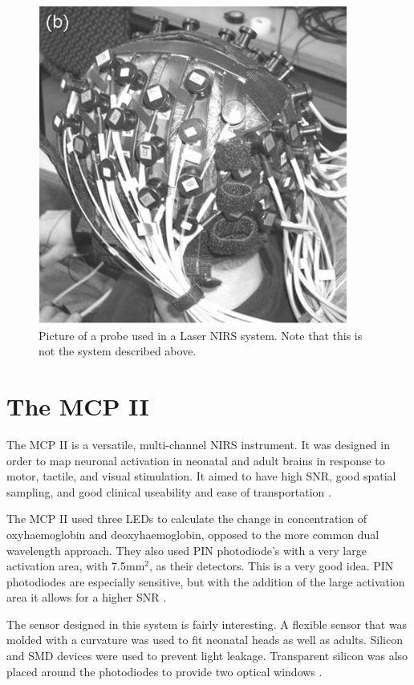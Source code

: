 \begin{figure}[htp]
\centering
\includegraphics[width=4in]{laser.png}
\caption[Laser NIRS System]{Picture of a probe used in a Laser NIRS system. Note that this is not the system described above. \cite{fran06}}
\end{figure}

\section{The MCP II}

The MCP II is a versatile, multi-channel NIRS instrument. It was designed in order to map neuronal activation in neonatal and adult brains in response to motor, tactile, and visual stimulation. It aimed to have high SNR, good spatial sampling, and good clinical useability and ease of transportation \cite{wolf05}.

The MCP II used three LEDs to calculate the change in concentration of oxyhaemoglobin and deoxyhaemoglobin, opposed to the more common dual wavelength approach. They also used PIN photodiode's with a very large activation area, with 7.5mm$^2$, as their detectors. This is a very good idea. PIN photodiodes are especially sensitive, but with the addition of the large activation area it allows for a higher SNR \cite{wolf05}. 

The sensor designed in this system is fairly interesting. A flexible sensor that was molded with a curvature was used to fit neonatal heads as well as adults. Silicon and SMD devices were used to prevent light leakage. Transparent silicon was also placed around the photodiodes to provide two optical windows \cite{wolf05}.

